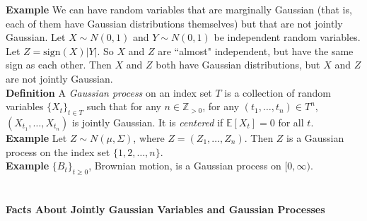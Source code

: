 \documentclass{article}
\theoremstyle{definition}
\newcommand{\E}{\mathbb{E}}
\newcommand{\Z}{\mathbb{Z}}
\begin{document}
\textbf{Example} We can have random variables that are marginally Gaussian (that is, each of them have Gaussian distributions themselves) but that are not jointly Gaussian.  Let $X\sim N(0,1)$ and $Y\sim N(0,1)$ be independent random variables.  Let $Z=\mathrm{sign}(X)|Y|$.  So $X$ and $Z$ are ``almost" independent, but have the same sign as each other.  Then $X$ and $Z$ both have Gaussian distributions, but $X$ and $Z$ are not jointly Gaussian.\\

\textbf{Definition} A \emph{Gaussian process} on an index set $T$ is a collection of random variables $\{X_t\}_{t\in T}$ such that for any $n\in\Z_{>0}$, for any $(t_1,\dots,t_n)\in T^n$, $(X_{t_1},\dots,X_{t_n})$ is jointly Gaussian.  It is \emph{centered} if $\E[X_t]=0$ for all $t$.\\

\textbf{Example} Let $Z\sim N(\mu, \Sigma)$, where $Z=(Z_1,\dots,Z_n)$.  Then $Z$ is a Gaussian process on the index set $\{1,2,\dots,n\}$.\\

\textbf{Example} $\{B_t\}_{t\geq 0}$, Brownian motion, is a Gaussian process on $[0,\infty)$.\\\\\\

\textbf{\Large Facts About Jointly Gaussian Variables and Gaussian Processes}\\
\end{document}
